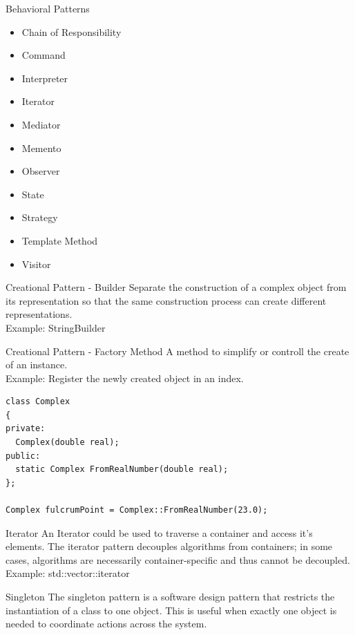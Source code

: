 \documentclass{beamer}
\begin{document}
\begin{frame}{Behavioral Patterns}
\begin{itemize}
  \item Chain of Responsibility
  \item Command
  \item Interpreter
  \item Iterator
  \item Mediator
  \item Memento
  \item Observer
  \item State
  \item Strategy
  \item Template Method
  \item Visitor
\end{itemize}
\end{frame}

\begin{frame}{Creational Pattern - Builder}
Separate the construction of a complex object from its representation so that
the same construction process can create different representations.
\\Example: StringBuilder
\end{frame}

\begin{frame}[fragile]{Creational Pattern - Factory Method}
A method to simplify or controll the create of an instance.
\\Example: Register the newly created object in an index.
\begin{lstlisting}
class Complex
{
private:
  Complex(double real);
public:
  static Complex FromRealNumber(double real);
};

Complex fulcrumPoint = Complex::FromRealNumber(23.0);
\end{lstlisting}

\end{frame}

\begin{frame}{Iterator}
An Iterator could be used to traverse a container and access it's elements. The
iterator pattern decouples algorithms from containers; in some cases, algorithms
are necessarily container-specific and thus cannot be decoupled.
\\Example: std::vector::iterator
\end{frame}

\begin{frame}{Singleton}
The singleton pattern is a software design pattern that restricts the
instantiation of a class to one object. This is useful when exactly one object
is needed to coordinate actions across the system.  
\end{frame}
\end{document}
